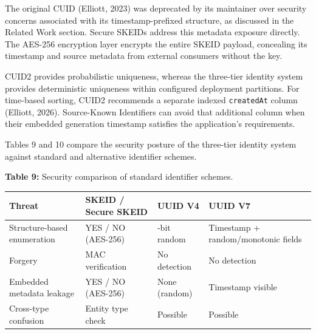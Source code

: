 \documentclass[fleqn,10pt,lineno]{wlpeerj}
\newcounter{none} %
\begin{document}
The original CUID (Elliott, 2023) was deprecated by its maintainer over
security concerns associated with its timestamp-prefixed structure, as
discussed in the Related Work section. Secure SKEIDs address this
metadata exposure directly. The AES-256 encryption layer encrypts the
entire SKEID payload, concealing its timestamp and source metadata from
external consumers without the key.

CUID2 provides probabilistic uniqueness, whereas the three-tier identity
system provides deterministic uniqueness within configured deployment
partitions. For time-based sorting, CUID2 recommends a separate indexed
\texttt{createdAt} column (Elliott, 2026). Source-Known Identifiers can
avoid that additional column when their embedded generation timestamp
satisfies the application's requirements.

Tables 9 and 10 compare the security posture of the three-tier identity
system against standard and alternative identifier schemes.

\textbf{Table 9:} Security comparison of standard identifier schemes.

{\def\LTcaptype{none} %
\begin{longtable}[]{@{}
  >{\raggedright\arraybackslash}p{}
  >{\raggedright\arraybackslash}p{}
  >{\raggedright\arraybackslash}p{}
  >{\raggedright\arraybackslash}p{}@{}}
\toprule\noalign{}
\begin{minipage}[b]{\linewidth}\raggedright
Threat
\end{minipage} & \begin{minipage}[b]{\linewidth}\raggedright
SKEID / Secure SKEID
\end{minipage} & \begin{minipage}[b]{\linewidth}\raggedright
UUID V4
\end{minipage} & \begin{minipage}[b]{\linewidth}\raggedright
UUID V7
\end{minipage} \\
\midrule\noalign{}
\endhead
\bottomrule\noalign{}
\endlastfoot
Structure-based enumeration & YES / NO (AES-256) & 122-bit random &
Timestamp + random/monotonic fields \\
Forgery & MAC verification & No detection & No detection \\
Embedded metadata leakage & YES / NO (AES-256) & None (random) &
Timestamp visible \\
Cross-type confusion & Entity type check & Possible & Possible \\
\end{longtable}
}
\end{document}
